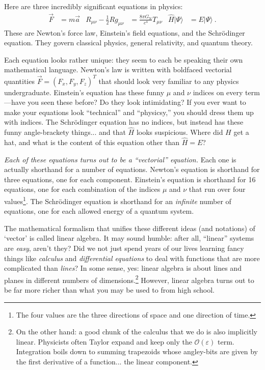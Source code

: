 \documentclass[12pt]{article}
\begin{document}
Here are three incredibly significant equations in physics:
\begin{align}
    \vec{F} &= m\vec{a}
    &
    R_{\mu\nu} - \frac{1}{2}Rg_{\mu\nu} 
    &= \frac{8\pi G_\text{N}}{c^4} T_{\mu\nu}
    &
    \hat H |\Psi\rangle 
    &= E |\Psi\rangle \ .
    \label{eq:three:equations}
\end{align}
These are Newton's force law, Einstein's field equations, and the Schr\"odinger equation. They govern classical physics, general relativity, and quantum theory. 


Each equation looks rather unique: they seem to each be speaking their own mathematical language. Newton's law is written with boldfaced vectorial quantities $\vec{F} = (F_x, F_y, F_z)^T$ that should look very familiar to any physics undergraduate. Einstein's equation has these funny $\mu$ and $\nu$ indices on every term---have you seen these before? Do they look intimidating? If you ever want to make your equations look ``technical'' and ``physicsy,'' you should dress them up with indices. The Schr\"odinger equation has no indices, but instead has these funny angle-brackety things... and that $\hat H$ looks suspicious. Where did $H$ get a hat, and what is the content of this equation other than $\hat H = E$?

\emph{Each of these equations turns out to be a ``vectorial'' equation.} Each one is actually shorthand for a number of equations. Newton's equation is shorthand for three equations, one for each component. Einstein's equation is shorthand for 16 equations, one for each combination of the indices $\mu$ and $\nu$ that run over four values\footnote{The four values are the three directions of space and one direction of time.}. The Schr\"odinger equation is shorthand for an \emph{infinite} number of equations, one for each allowed energy of a quantum system.

The mathematical formalism that unifies these different ideas (and notations) of `vector' is called linear algebra. It may sound humble: after all, ``linear'' systems are \emph{easy}, aren't they? Did we not just spend years of our lives learning fancy things like \emph{calculus} and \emph{differential equations} to deal with functions that are more complicated than \emph{lines}? In some sense, yes: linear algebra is about lines and planes in different numbers of dimensions.\footnote{On the other hand: a good chunk of the calculus that we do is also implicitly linear. Physicists often Taylor expand and keep only the $\mathcal O(\varepsilon)$ term. Integration boils down to summing trapezoids whose angley-bits are given by the first derivative of a function... the linear component.} However, linear algebra turns out to be far more richer than what you may be used to from high school. 
\end{document}
